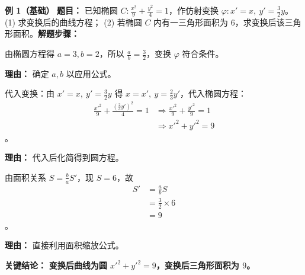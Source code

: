 \begin{examplebox}
	\textbf{\textcolor{CExample}{例 1（基础）}}
	\textbf{\textcolor{CExample}{题目：}} 已知椭圆 $C:\frac{x^2}{9}+\frac{y^2}{4}=1$，作仿射变换 $\varphi: x'=x,\ y'=\frac{3}{2}y$。 (1) 求变换后的曲线方程； (2) 若椭圆 $C$ 内有一三角形面积为 $6$，求变换后该三角形面积。\textbf{\textcolor{CExample}{解题步骤：}}
	\begin{description}[style=nextline, leftmargin=2.8em, labelsep=0.5em, itemsep=0.45em]
		\item[\textbf{第一步（确定参数）：}]
			由椭圆方程得 $a=3,b=2$，所以 $\frac{a}{b}=\frac{3}{2}$，变换 $\varphi$ 符合条件。
			\par\textbf{理由：} 确定 $a,b$ 以应用公式。
		\item[\textbf{第二步（化圆方程）：}]
			代入变换：由 $x'=x,\ y'=\frac{3}{2}y$ 得 $x=x',\ y=\frac{2}{3}y'$，代入椭圆方程：
			\[
				\begin{aligned}
					\frac{x'^2}{9}+\frac{(\frac{2}{3}y')^2}{4}=1 &\Rightarrow \frac{x'^2}{9}+\frac{y'^2}{9}=1 \\ &\Rightarrow x'^2+y'^2=9
			\end{aligned}
			\]
			。
			\par\textbf{理由：} 代入后化简得到圆方程。
		\item[\textbf{第三步（面积计算）：}]
			由面积关系 $S=\frac{b}{a}S'$，现 $S=6$，故
			\[
				\begin{aligned}
					S'&=\frac{a}{b}S \\ &=\frac{3}{2}\times6 \\ &=9
			\end{aligned}
			\]
			。
			\par\textbf{理由：} 直接利用面积缩放公式。
	\end{description}
	\textbf{\textcolor{CExample}{关键结论：}}
	\textbf{变换后曲线为圆 $x'^2+y'^2=9$，变换后三角形面积为 $9$。}
\end{examplebox}

